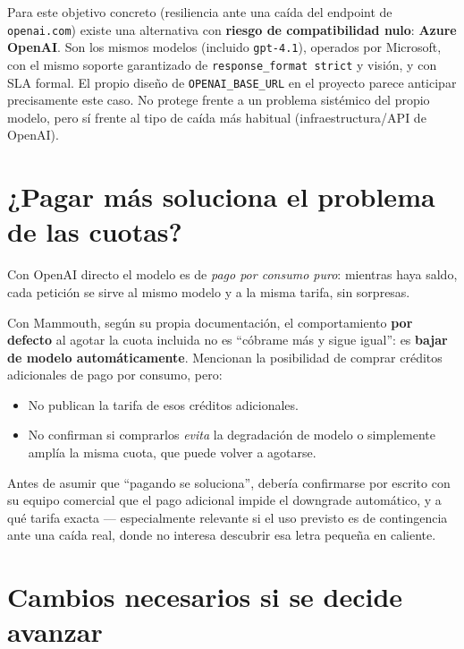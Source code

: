 \documentclass[11pt,a4paper]{article}
\begin{document}
Para este objetivo concreto (resiliencia ante una caída del endpoint de
\texttt{openai.com}) existe una alternativa con \textbf{riesgo de compatibilidad
nulo}: \textbf{Azure OpenAI}. Son los mismos modelos (incluido \texttt{gpt-4.1}),
operados por Microsoft, con el mismo soporte garantizado de
\texttt{response\_format strict} y visión, y con SLA formal. El propio diseño de
\texttt{OPENAI\_BASE\_URL} en el proyecto parece anticipar precisamente este caso.
No protege frente a un problema sistémico del propio modelo, pero sí frente al
tipo de caída más habitual (infraestructura/API de OpenAI).

\section{¿Pagar más soluciona el problema de las cuotas?}

Con OpenAI directo el modelo es de \emph{pago por consumo puro}: mientras haya
saldo, cada petición se sirve al mismo modelo y a la misma tarifa, sin sorpresas.

Con Mammouth, según su propia documentación, el comportamiento \textbf{por
defecto} al agotar la cuota incluida no es ``cóbrame más y sigue igual'': es
\textbf{bajar de modelo automáticamente}. Mencionan la posibilidad de comprar
créditos adicionales de pago por consumo, pero:

\begin{itemize}
    \item No publican la tarifa de esos créditos adicionales.
    \item No confirman si comprarlos \emph{evita} la degradación de modelo o
    simplemente amplía la misma cuota, que puede volver a agotarse.
\end{itemize}

Antes de asumir que ``pagando se soluciona'', debería confirmarse por escrito con
su equipo comercial que el pago adicional impide el downgrade automático, y a qué
tarifa exacta --- especialmente relevante si el uso previsto es de contingencia
ante una caída real, donde no interesa descubrir esa letra pequeña en caliente.

\section{Cambios necesarios si se decide avanzar}
\end{document}
